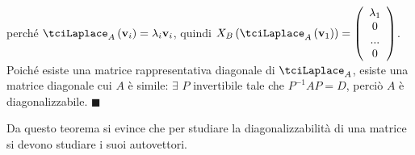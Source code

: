 \documentclass{article}
\begin{document}
perch\'{e} $\tciLaplace _{A}\left( \mathbf{v}_{i}\right) =\lambda _{i}%
\mathbf{v}_{i}$, quindi $X_{B}\left( \tciLaplace _{A}\left( \mathbf{v}%
_{1}\right) \right) =\left( 
\begin{array}{c}
\lambda _{1} \\ 
0 \\ 
... \\ 
0%
\end{array}%
\right) $. Poich\'{e} esiste una matrice rappresentativa diagonale di $%
\tciLaplace _{A}$, esiste una matrice diagonale cui $A$ \`{e} simile: $%
\exists $ $P$ invertibile tale che $P^{-1}AP=D$, perci\`{o} $A$ \`{e}
diagonalizzabile. $\blacksquare $

Da questo teorema si evince che per studiare la diagonalizzabilit\`{a} di
una matrice si devono studiare i suoi autovettori.
\end{document}

